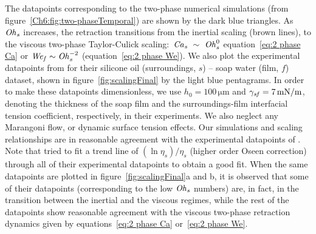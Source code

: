 The datapoints corresponding to the two-phase numerical simulations (from figure~\ref{Ch6:fig:two-phaseTemporal}) are shown by the dark blue triangles. As $\mathit{Oh}_\mathit{s}$ increases, the retraction transitions from the inertial scaling (brown lines), to the viscous two-phase Taylor-Culick scaling:~$\mathit{Ca}_\mathit{s}~\sim~\mathit{Oh}_\mathit{s}^0$ equation~\eqref{eq:2 phase Ca} or $\mathit{We}_\mathit{f} \sim \mathit{Oh}_\mathit{s}^{-2}$ (equation~\eqref{eq:2 phase We}). We also plot the experimental datapoints from \citet{reyssat-2006-epl} for their silicone oil (surroundings, $s$) -- soap water (film, $f$) dataset, shown in figure~\ref{fig:scalingFinal} by the light blue pentagrams. In order to make these datapoints dimensionless, we use $h_0 = 100\,\si{\micro\meter}$ and $\gamma_\mathit{sf} = 7\,\si{\milli\newton}/\si{\meter}$, denoting the thickness of the soap film and the surroundings-film interfacial tension coefficient, respectively, in their experiments. We also neglect any Marangoni flow, or dynamic surface tension effects. Our simulations and scaling relationships are in reasonable agreement with the experimental datapoints of \citet{reyssat-2006-epl}. Note that \citet{reyssat-2006-epl} tried to fit a trend line of $\left(\ln\eta_{s}\right)/\eta_{s}$ (higher order Oseen correction) through all of their experimental datapoints to obtain a good fit. When the same datapoints are plotted in figure~\ref{fig:scalingFinal}a and b, it is observed that some of their datapoints (corresponding to the low $\mathit{Oh}_\mathit{s}$ numbers) are, in fact, in the transition between the inertial and the viscous regimes, while the rest of the datapoints show reasonable agreement with the viscous two-phase retraction dynamics given by equations~\eqref{eq:2 phase Ca} or~\eqref{eq:2 phase We}. 


